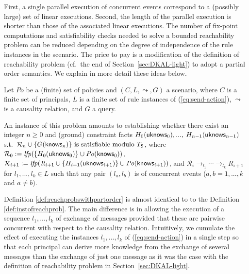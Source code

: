 \documentclass[conference]{llncs}
\newcommand{\know}{\ensuremath \mathsf{knows}}
\newcommand{\knowzero}{\ensuremath \mathsf{uknows}}
\begin{document}
{First,
a single parallel execution of concurrent events correspond to a
(possibly large) set of linear executions. Second, the length of the
parallel execution is shorter than those of the associated linear
executions.  The number of fix-point computations and satisfiability
checks needed to solve a bounded reachability problem can be reduced
depending on the degree of independence of the rule instances in the
scenario. The price to pay is a modification of the definition of
reachability problem (cf.~the end of Section~\ref{sec:DKAL-light}) to
adopt a partial order semantics. We explain in more detail these ideas
below.

Let $\mathit{Po}$ be a (finite) set of policies and $(C, L, \leadsto,
G)$ a scenario, where $C$ is a finite set of principals, $L$ is a
finite set of rule instances of (\ref{eq:send-action}), $\leadsto$ is
a causality relation, and $G$ a query.  



\begin{definition}
  \label{def:reachprobswithpartorder}
An instance of this problem 
amounts to establishing whether there exist an integer $n\geq 0$ and (ground) constraint facts
$H_0(\knowzero_0), ...,$ $H_{n-1}(\knowzero_{n-1})$ s.t.~$\mathcal{R}_n\cup \{ G(\know_n) \} ~ \text{is satisfiable modulo}
~ T_{\mathsf{S}}$,
where $\mathcal{R}_0 :=
\mathit{lfp}(\{H_0(\knowzero_0)\} \cup \mathit{Po}(\know_0))$,
$\mathcal{R}_{i+1} := \mathit{lfp}(\mathit{R}_{i+1} \cup
\{H_{i+1}(\knowzero_{i+1})\} \cup \mathit{Po}(\know_{i+1}))$, and
$\mathcal{R}_i \rightarrow_{l_1} \cdots \rightarrow_{l_k} \mathit{R}_{i+1}$
for $l_1, ..., l_k\in L$ such that any pair $(l_a,l_b)$ is of
concurrent events ($a,b=1, ..., k$ and $a\neq b$).
\end{definition}


Definition \ref{def:reachprobswithpartorder} is
almost identical to to the Definition \ref{def:instofreachprob}. The main
difference is in allowing the execution of a sequence $l_1, ..., l_k$
of exchange of messages provided that these are pairwise concurrent
with respect to the causality relation.  Intuitively, we cumulate the
effect of executing the instances $l_1, ..., l_k$ of
(\ref{eq:send-action}) in a single step so that each principal can
derive more knowledge from the exchange of several messages than the
exchange of just one message as it was the case with the definition of
reachability problem in Section~\ref{sec:DKAL-light}.

}
\end{document}
